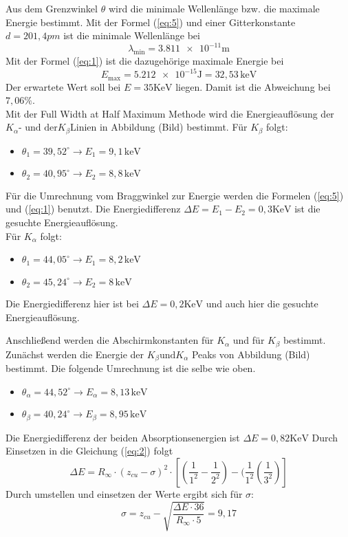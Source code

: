 Aus dem Grenzwinkel $\theta$ wird die minimale Wellenlänge bzw. die maximale Energie bestimmt.
Mit der Formel (\ref{eq:5}) und einer Gitterkonstante $d=201,4 pm$  ist die minimale Wellenlänge bei
\begin{equation*}
  \lambda_{\text{min}} = \num{3.811e-11} \text{m}
\end{equation*}
Mit der Formel (\ref{eq:1}) ist die dazugehörige maximale Energie bei
\begin{equation*}
  E_{\text{max}} = \num{5.212e-15} \text{J} = 32,53 \, \text{keV}
\end{equation*}
Der erwartete Wert soll bei $E = 35 \text{KeV}$ liegen.
Damit ist die Abweichung bei $7,06 \%$.\\

Mit der Full Width at Half Maximum Methode wird die Energieauflösung der $K_\alpha \text{- und der} K_\beta \text{Linien}$ in Abbildung (Bild) bestimmt.
Für $K_\beta$ folgt:
\begin{itemize}
  \item $\theta_1 = 39,52^\circ \rightarrow E_1 = 9,1 \, \text{keV}$
  \item $\theta_2 = 40,95^\circ \rightarrow E_2 = 8,8 \, \text{keV}$
\end{itemize}
Für die Umrechnung vom Braggwinkel zur Energie werden die Formelen (\ref{eq:5}) und (\ref{eq:1}) benutzt.
Die Energiedifferenz $\Delta E = E_1 - E_2 = 0,3 \text{KeV}$ ist die gesuchte Energieauflösung.\\

Für $K_\alpha$ folgt:
\begin{itemize}
  \item $\theta_1 = 44,05^\circ \rightarrow E_1 = 8,2 \, \text{keV}$
  \item $\theta_2 = 45,24^\circ \rightarrow E_2 = 8 \, \text{keV}$
\end{itemize}
Die Energiedifferenz hier ist bei $\Delta E = 0,2 \text{KeV}$ und auch hier die gesuchte Energieauflösung.

Anschließend werden die Abschirmkonstanten für $K_\alpha$ und für $K_\beta$ bestimmt.
Zunächst werden die Energie der $K_\beta \text{und} K_\alpha$ Peaks von Abbildung (Bild) bestimmt.
Die folgende Umrechnung ist die selbe wie oben.
\begin{itemize}
  \item $\theta_\alpha = 44,52^\circ \rightarrow E_\alpha = 8,13 \,\text{keV}$
  \item $\theta_\beta = 40,24^\circ \rightarrow E_\beta = 8,95 \,\text{keV}$
\end{itemize}
Die Energiedifferenz der beiden Absorptionsenergien ist $\Delta E = 0,82 \text{KeV}$
Durch Einsetzen in die Gleichung (\ref{eq:2}) folgt
\begin{equation*}
  \Delta E = R_\infty \cdot (z_{cu} - \sigma)^2 \cdot [(\frac{1}{1^2}-\frac{1}{2^2})-(\frac{1}{1^2}(\frac{1}{3^2})]
\end{equation*}
Durch umstellen und einsetzen der Werte ergibt sich für $\sigma$:
\begin{equation*}
  \sigma = z_{cu} - \sqrt{\frac{\Delta E \cdot 36}{R_\infty \cdot 5}} = 9,17
\end{equation*}

